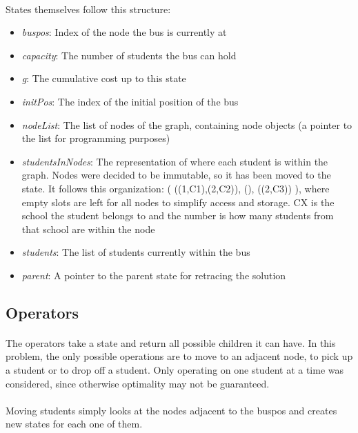 \paragraph{}
States themselves follow this structure:

\begin{itemize}
    \item[] \textit{buspos}: Index of the node the bus is currently at
    \item[] \textit{capacity}: The number of students the bus can hold
    \item[] \textit{g}: The cumulative cost up to this state
    \item[] \textit{initPos}: The index of the initial position of the bus
    \item[] \textit{nodeList}: The list of nodes of the graph, containing node objects (a pointer to the list for programming purposes)
    \item[] \textit{studentsInNodes}: The representation of where each student is within the graph. Nodes were decided to be immutable, so it has been moved to the state. It follows this organization: ( ((1,C1),(2,C2)), (), ((2,C3)) ), where empty slots are left for all nodes to simplify access and storage. CX is the school the student belongs to and the number is how many students from that school are within the node
    \item[] \textit{students}: The list of students currently within the bus
    \item[] \textit{parent}: A pointer to the parent state for retracing the solution
\end{itemize}

\subsection{Operators}
\paragraph{}
The operators take a state and return all possible children it can have. In this problem, the only possible operations are to move to an adjacent node, to pick up a student or to drop off a student. Only operating on one student at a time was considered, since otherwise optimality may not be guaranteed.

\paragraph{}
Moving students simply looks at the nodes adjacent to the buspos and creates new states for each one of them.

